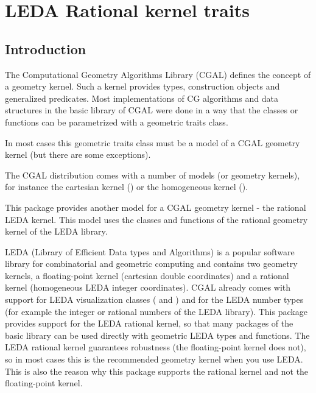 

\chapter{LEDA Rational kernel traits}
\label{chapterLeda_rat_kernel}

\section{Introduction}

The Computational Geometry Algorithms Library (CGAL) defines the concept of a geometry
kernel. Such a kernel provides types, construction objects and generalized
predicates. Most implementations of CG algorithms and data structures 
in the basic library of CGAL were done in a way that the classes or functions can be
parametrized with a geometric traits class. 

In most cases this geometric traits class must be a model of a CGAL geometry kernel
(but there are some exceptions).

The CGAL distribution comes with a number of models (or geometry kernels), for instance
the cartesian kernel () or the homogeneous kernel ().

This package provides another model for a CGAL geometry kernel - the rational LEDA kernel.
This model uses the classes and functions of the rational geometry kernel of the LEDA
library.

LEDA (Library of Efficient Data types and Algorithms) is a popular software library
for combinatorial and geometric computing and contains two geometry kernels,
a floating-point kernel (cartesian double coordinates) and a rational kernel (homogeneous LEDA integer
coordinates). CGAL already comes with support for LEDA visualization classes ( and
) and for the LEDA number types (for example the integer or rational numbers
of the LEDA library). This package provides support for the LEDA rational kernel, so that
many packages of the basic library can be used directly with geometric LEDA types and functions.
The LEDA rational kernel guarantees robustness (the floating-point kernel does not), so in most cases
this is the recommended geometry kernel when you use LEDA. This is also the reason why this
package supports the rational kernel and not the floating-point kernel.

